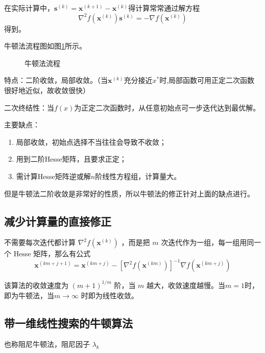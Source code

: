\documentclass{book}
\begin{document}
在实际计算中，$\boldsymbol{s}^{(k)}=\boldsymbol{x}^{(k+1)}-\boldsymbol{x}^{(k)}$得计算常常通过解方程
$$
    \nabla^2f(\boldsymbol{x}^{(k)})\boldsymbol{s}^{(k)}=-\nabla f(\boldsymbol{x}^{(k)})
$$
得到。

牛顿法流程图如图\ref{fig:flow of unconstrained Newton's method}所示。

\begin{figure}[ht]
    \centering
    
    \caption{牛顿法流程}
    \label{fig:flow of unconstrained Newton's method}
\end{figure}


特点：二阶收敛，局部收敛。（当$\boldsymbol{x}^{(k)}$充分接近$x^*$时,局部函数可用正定二次函数很好地近似，故收敛很快）

二次终结性：当$f(x)$为正定二次函数时，从任意初始点可一步迭代达到最优解。

主要缺点：
\begin{enumerate}
    \item 局部收敛，初始点选择不当往往会导致不收敛；
    \item 用到二阶Hesse矩阵，且要求正定；
    \item 需计算Hesse矩阵逆或解$n$阶线性方程组，计算量大。
\end{enumerate}

但是牛顿法二阶收敛是非常好的性质，所以牛顿法的修正针对上面的缺点进行。

\subsection{减少计算量的直接修正}

不需要每次迭代都计算 $\nabla^2f(\boldsymbol{x}^{(k)})$ ，而是把 $m$ 次迭代作为一组，每一组用同一个 Hesse 矩阵，那么有公式
$$
    \boldsymbol{x}^{(km+j+1)} = \boldsymbol{x}^{(km+j)}-[\nabla^2f(\boldsymbol{x}^{(km)})]^{-1}\nabla f(\boldsymbol{x}^{(km+j)})
$$

该算法的收敛速度为 $(m+1)^{1/m}$ 阶，当 $m$ 越大，收敛速度越慢。当$m=1$时，即为牛顿法，当$m\rightarrow\infty$ 时即为线性收敛。

\subsection{带一维线性搜索的牛顿算法}

也称阻尼牛顿法，阻尼因子 $\lambda_k$
\end{document}
